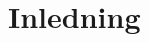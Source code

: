 \documentclass[systemskiss/skiss.tex]{subfiles}
\begin{document}
\section{Inledning}
\end{document}
